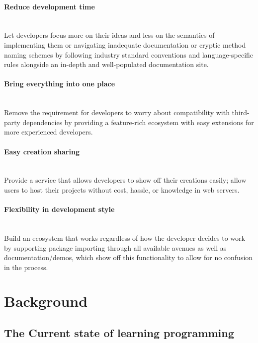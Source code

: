 \documentclass{l4proj}
\begin{document}
\subsubsection{Reduce development time} \hfill\\
\text Let developers focus more on their ideas and less on the semantics of implementing them or navigating inadequate documentation or cryptic method naming schemes by following industry standard conventions and language-specific rules alongside an in-depth and well-populated documentation site.
\\
\subsubsection{Bring everything into one place} \hfill\\
\text Remove the requirement for developers to worry about compatibility with third-party dependencies by providing a feature-rich ecosystem with easy extensions for more experienced developers.
\\
\subsubsection{Easy creation sharing}\hfill\\
\text Provide a service that allows developers to show off their creations easily; allow users to host their projects without cost, hassle, or knowledge in web servers.
\\
\subsubsection{Flexibility in development style}\hfill\\
\text Build an ecosystem that works regardless of how the developer decides to work by supporting package importing through all available avenues as well as documentation/demos, which show off this functionality to allow for no confusion in the process.


\chapter{Background}

\section{The Current state of learning programming}
\end{document}
